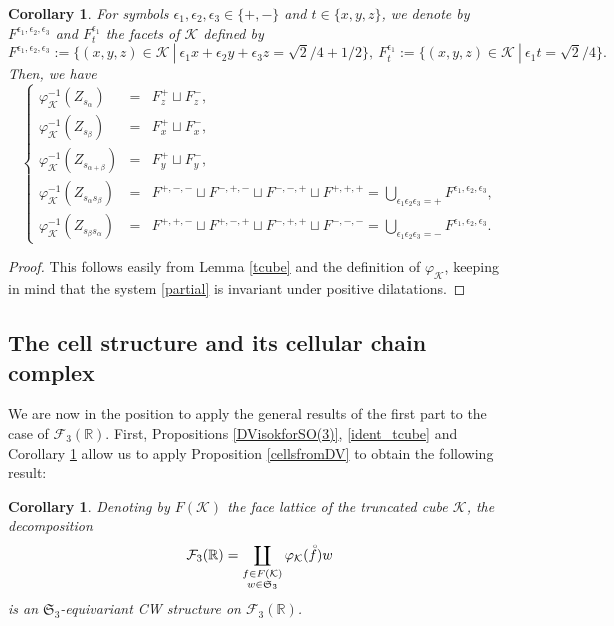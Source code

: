 \documentclass[11pt,twoside]{amsart}
\theoremstyle{plain}
\newtheorem{cor}[prop]{Corollary}
\newcommand{\R}{{\mathbb R}}
\newcommand{\Sym}{\mathfrak{S}}
\newcommand{\interior}[1]{\accentset{\circ}{#1}}
\begin{document}
\begin{cor}\label{ident_faces}
For symbols $\epsilon_1,\epsilon_2,\epsilon_3\in\{+,-\}$ and $t\in\{x,y,z\}$, we denote by $F^{\epsilon_1,\epsilon_2,\epsilon_3}$ and $F^{\epsilon_1}_t$ the facets of $\mathcal{K}$ defined by
\[F^{\epsilon_1,\epsilon_2,\epsilon_3}:=\{(x,y,z)\in\mathcal{K}~|~\epsilon_1x+\epsilon_2y+\epsilon_3z=\sqrt{2}/4+1/2\},~F^{\epsilon_1}_t:=\{(x,y,z)\in\mathcal{K}~|~\epsilon_1t=\sqrt{2}/{4}\}.\]
Then, we have
\[\left\{\begin{array}{rcl}
\varphi_{\mathcal{K}}^{-1}(Z_{s_\alpha}) & = & F_z^+\sqcup F_z^-, \\[.5em]
\varphi_{\mathcal{K}}^{-1}(Z_{s_\beta}) & = & F_x^+\sqcup F_x^-, \\[.5em]
\varphi_{\mathcal{K}}^{-1}(Z_{s_{\alpha+\beta}}) & = & F_y^+\sqcup F_y^-, \\[.5em]
\varphi_{\mathcal{K}}^{-1}(Z_{s_\alpha s_\beta}) & = & F^{+,-,-}\sqcup F^{-,+,-}\sqcup F^{-,-,+}\sqcup F^{+,+,+}=\bigcup_{\epsilon_1\epsilon_2\epsilon_3=+}F^{\epsilon_1,\epsilon_2,\epsilon_3}, \\[.5em]
\varphi_{\mathcal{K}}^{-1}(Z_{s_\beta s_\alpha}) & = & F^{+,+,-}\sqcup F^{+,-,+}\sqcup F^{-,+,+}\sqcup F^{-,-,-}=\bigcup_{\epsilon_1\epsilon_2\epsilon_3=-}F^{\epsilon_1,\epsilon_2,\epsilon_3}.\end{array}\right.\]
\end{cor}
\begin{proof}
This follows easily from Lemma \ref{tcube} and the definition of $\varphi_{\mathcal{K}}$, keeping in mind that the system \eqref{partial} is invariant under positive dilatations.
\end{proof}









\subsection{The cell structure and its cellular chain complex}

We are now in the position to apply the general results of the first part to the case of $\mathcal{F}_3(\R)$. First, Propositions \ref{DVisokforSO(3)}, \ref{ident_tcube} and Corollary \ref{ident_faces} allow us to apply Proposition \ref{cellsfromDV} to obtain the following result:
\begin{cor}\label{indeedequivdec}
Denoting by $F(\mathcal{K})$ the face lattice of the truncated cube $\mathcal{K}$, the decomposition
\[\mathcal{F}_3(\R)=\coprod_{\substack{f\in F(\mathcal{K}) \\ w\in\Sym_3}}\varphi_{\mathcal{K}}(\interior{f})w\]
is an $\Sym_3$-equivariant CW structure on $\mathcal{F}_3(\R)$.
\end{cor}
\end{document}
